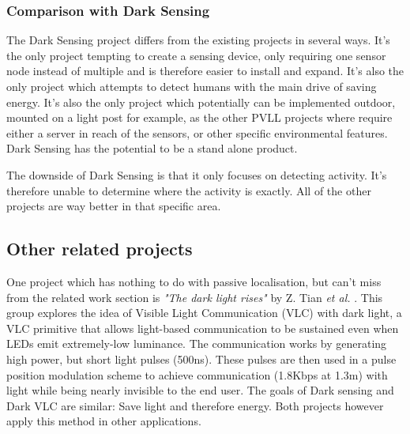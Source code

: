 \subsubsection{Comparison with Dark Sensing}
The Dark Sensing project differs from the existing projects in several ways. It's the only project tempting to create a sensing device, only requiring one sensor node instead of multiple and is therefore easier to install and expand. It's also the only project which attempts to detect humans with the main drive of saving energy. It's also the only project which potentially can be implemented outdoor, mounted on a light post for example, as the other PVLL projects where require either a server in reach of the sensors, or other specific environmental features. Dark Sensing has the potential to be a stand alone product.

The downside of Dark Sensing is that it only focuses on detecting activity. It's therefore unable to determine where the activity is exactly. All of the other projects are way better in that specific area.

\subsection{Other related projects}
One project which has nothing to do with passive localisation, but can't miss from the related work section is \textit{"The dark light rises"} by Z. Tian \textit{et al.} \cite{Dark_Light_Rises} \cite{Dark_VLC}. This group explores the idea of Visible Light Communication (VLC) with dark light, a VLC primitive that allows light-based communication to be sustained even when LEDs emit extremely-low luminance. The communication works by generating high power, but short light pulses (500ns). These pulses are then used in a pulse position modulation scheme to achieve communication (1.8Kbps at 1.3m) with light while being nearly invisible to the end user. The goals of Dark sensing and Dark VLC are similar: Save light and therefore energy. Both projects however apply this method in other applications.